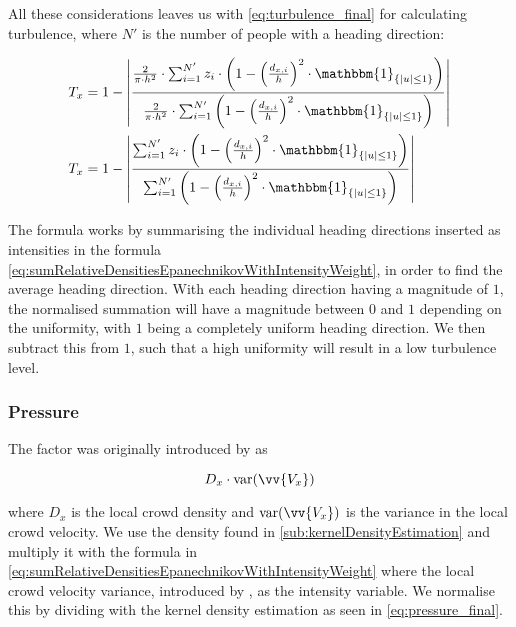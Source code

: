 All these considerations leaves us with \cref{eq:turbulence_final} for calculating turbulence, where $N'$ is the number of people with a heading direction:

\begin{equation}
\label{eq:turbulence_final}
\begin{split}
T_x &= 1 - \left|\frac{\frac{2}{\pi \cdot h^2} \cdot \sum_{i=1}^{N'} z_i \cdot \left(1-\left(\frac{d_{x,i}}{h}\right)^2 \cdot \mathbbm{1}_{\{|u| \leq 1\} }\right)}{\frac{2}{\pi \cdot h^2} \cdot \sum_{i=1}^{N'} \left(1-\left(\frac{d_{x,i}}{h}\right)^2 \cdot \mathbbm{1}_{\{|u| \leq 1\} }\right)}\right| \\
%
%
T_x &= 1 - \left|\frac{\sum_{i=1}^{N'} z_i \cdot \left(1-\left(\frac{d_{x,i}}{h}\right)^2 \cdot \mathbbm{1}_{\{|u| \leq 1\} }\right)}{\sum_{i=1}^{N'} \left(1-\left(\frac{d_{x,i}}{h}\right)^2 \cdot \mathbbm{1}_{\{|u| \leq 1\} }\right)}\right|
\end{split}
\end{equation}

The formula works by summarising the individual heading directions inserted as intensities in the formula \cref{eq:sumRelativeDensitiesEpanechnikovWithIntensityWeight}, in order to find the average heading direction. With each heading direction having a magnitude of $1$, the normalised summation will have a magnitude between $0$ and $1$ depending on the uniformity, with $1$ being a completely uniform heading direction. We then subtract this from $1$, such that a high uniformity will result in a low turbulence level.


\subsubsection{Pressure}
The factor was originally introduced by \citet{empircalstudy} as 

\begin{equation}
D_x \cdot \text{var}(\vv{V_x})
\end{equation}

where $D_x$ is the local crowd density and $\text{var}(\vv{V_x})$ is the variance in the local crowd velocity. We use the density found in \cref{sub:kernelDensityEstimation} and multiply it with the formula in \cref{eq:sumRelativeDensitiesEpanechnikovWithIntensityWeight} where the local crowd velocity variance, introduced by \citet{wirz2012inferring}, as the intensity variable. We normalise this by dividing with the kernel density estimation as seen in \cref{eq:pressure_final}.


